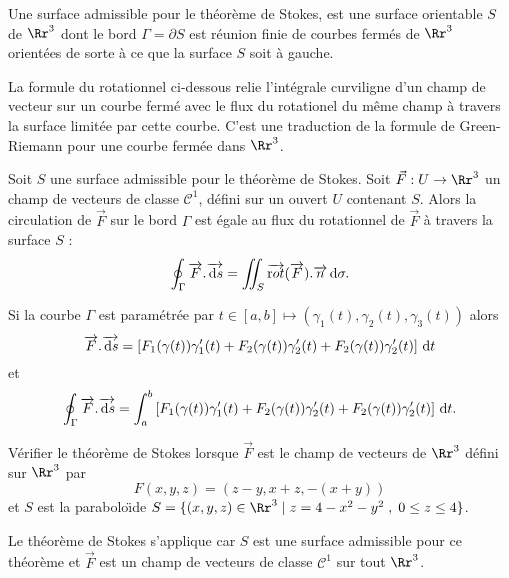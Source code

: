 \documentclass[class=report,crop=false]{standalone}
\begin{document}
\vskip4mm

\begin{definition}Une surface admissible pour le théorème de Stokes, est une surface orientable $S$ de $\Rr^3$ dont le bord $\Gamma =\partial S$ est réunion finie de courbes fermés de $\Rr^3$ orientées de sorte à ce que la surface $S$ soit à gauche.
\end{definition}

\vskip4mm

\noindent La formule du rotationnel ci-dessous relie l'intégrale curviligne d'un champ de vecteur sur un courbe fermé avec le flux du rotationel du m\^eme champ à travers la surface limitée par cette courbe. C'est une traduction de la formule de Green-Riemann pour une courbe fermée dans $\Rr^3$.

\vskip6mm

\begin{theoreme}[\bf Stokes]Soit $S$ une surface admissible pour le théorème de Stokes. Soit $\vec{F}: U\to \Rr^3$ un champ de vecteurs de classe $\mathscr{C}^1$, défini sur un ouvert $U$ contenant $S$. Alors la circulation de $\vec{F}$ sur le bord $\Gamma$ est égale au flux du rotationnel de $\vec{F}$ à travers la surface $S$ :
$$\oint _{\Gamma}\overrightarrow{F}.\overrightarrow{\,\mathrm{d} s}=\int \!\!\!\!\int _S\overrightarrow{\mathrm rot}(\overrightarrow{F}).\overrightarrow{n}\,\mathrm{d} \sigma .$$
\end{theoreme}

\vskip6mm

Si la courbe $\Gamma$ est paramétrée par $t\in [a,b]\mapsto (\gamma _1(t),\gamma _2(t),\gamma _3(t))$ alors 
$$\overrightarrow{F}.\overrightarrow{\,\mathrm{d} s}=\left[F_1(\gamma (t))\gamma _1'(t)+F_2(\gamma (t))\gamma _2'(t)+F_2(\gamma (t))\gamma _2'(t)\right]\,\mathrm{d} t$$
et
$$\oint _{\Gamma}\overrightarrow{F}.\overrightarrow{\,\mathrm{d} s}=\int _a^b\left[F_1(\gamma (t))\gamma _1'(t)+F_2(\gamma (t))\gamma _2'(t)+F_2(\gamma (t))\gamma _2'(t)\right]\,\mathrm{d} t.$$

\vskip6mm

Vérifier le théorème de Stokes lorsque $\overrightarrow{F}$ est le champ de vecteurs de $\Rr^3$ défini sur $\Rr^3$ par
$$F(x,y,z)=(z-y,x+z,-(x+y))$$
et $S$ est la parabolo\"{\i}de $S=\{(x,y,z)\in \Rr^3\mid z=4-x^2-y^2\; ,\; 0\leq z\leq 4\}$.

\vskip3mm

\noindent Le théorème de Stokes s'applique car $S$ est une surface admissible pour ce théorème et $\overrightarrow{F}$ est un champ de vecteurs de classe $\mathscr{C}^1$ sur tout $\Rr^3$.
\end{document}
